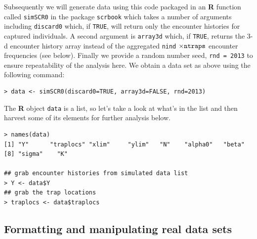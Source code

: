  Subsequently we will generate data using this code packaged in an
 {\bf R} function called \mbox{\tt simSCR0} in the package
 \mbox{\tt scrbook} which takes a number of arguments including
 \mbox{\tt discard0} which, if \mbox{\tt TRUE}, will return only the
 encounter histories for captured individuals.  A second argument is
 \mbox{\tt array3d} which, if \mbox{\tt TRUE}, returns the 3-d
 encounter history array instead of the aggregated \mbox{\tt nind}
 $\times \mbox{\tt ntraps}$ encounter frequencies (see below). Finally
 we provide a random number seed, \mbox{\tt rnd = 2013} to ensure
 repeatability of the analysis here. We obtain a data set as above
 using the following command:
\begin{verbatim}
> data <- simSCR0(discard0=TRUE, array3d=FALSE, rnd=2013)
\end{verbatim}
The {\bf R} object \mbox{\tt data} is a list, so let's take a look at
what's in the list and then harvest some of its elements for further
analysis below.
{\small
\begin{verbatim}
> names(data)
[1] "Y"      "traplocs" "xlim"     "ylim"   "N"    "alpha0"   "beta"
[8] "sigma"    "K"

## grab encounter histories from simulated data list
> Y <- data$Y
## grab the trap locations
> traplocs <- data$traplocs
\end{verbatim}
}

\subsection{Formatting and manipulating real data sets}
\label{scr0.sec.formats}


